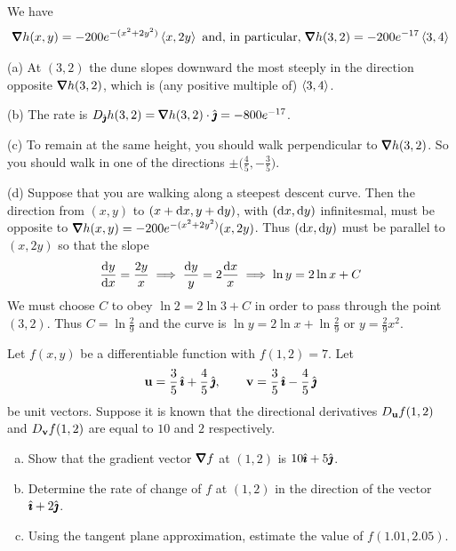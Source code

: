 \begin{solution}
We have
\begin{equation*}
\vnabla h(x,y)= -200 e^{-(x^2+2y^2)}\llt x,2y\rgt\text{ and, in particular, }
\vnabla h(3,2)= -200 e^{-17}\llt 3,4\rgt
\end{equation*}

(a) At $(3,2)$ the dune slopes downward the most steeply in the direction
opposite $\vnabla h(3,2)$, which is (any positive multiple of) $\left< 3,4\right>$.

(b) The rate is $D_{\hj} h(3,2)=\vnabla h(3,2)\cdot\hj=-800 e^{-17}$.

(c) To remain at the same height, you should walk perpendicular to
$\vnabla h(3,2)$. So you should walk in one of the directions 
$\pm\big(\frac{4}{5},-\frac{3}{5}\big)$.

(d) Suppose that you are walking along a steepest descent curve.
Then the direction from $(x,y)$ to $(x+\mathrm{d}x, y+\mathrm{d}y)$, with 
$(\mathrm{d}x,\mathrm{d}y)$ infinitesmal, must be opposite to 
$\vnabla h(x,y)= -200 e^{-(x^2+2y^2)}(x,2y)$.
Thus $(\mathrm{d}x,\mathrm{d}y)$ must be parallel to $(x,2y)$ so that the slope
\begin{align*}
\diff{y}{x}=\frac{2y}{x}
\implies \frac{\dee{y}}{y}=2\frac{\dee{x}}{x}
\implies \ln y=2\ln x+C
\end{align*}
We must choose $C$ to obey $\ln 2=2\ln 3+C$ in order to pass through 
the point $(3,2)$. Thus $C=\ln\frac{2}{9}$ and the curve is 
$\ln y=2\ln x+\ln\frac{2}{9}$ or $y=\frac{2}{9}x^2$.
\end{solution}

\begin{question}[M200 2002A] %
Let $f(x,y)$ be a differentiable function with $f(1,2)=7$. Let
\begin{equation*}
\mathbf{u}=\frac{3}{5}\,\hat{\pmb{\imath}}+\frac{4}{5}\,\hat{\pmb{\jmath}},\qquad
\mathbf{v}=\frac{3}{5}\,\hat{\pmb{\imath}}-\frac{4}{5}\,\hat{\pmb{\jmath}}
\end{equation*}
be unit vectors. Suppose it is known that the directional derivatives 
$D_{\mathbf{u}} f(1,2)$ and $D_{\mathbf{v}} f(1,2)$ are equal to $10$ and $2$ respectively.
\begin{enumerate}[(a)]
\item
Show that the gradient vector $\vnabla f$ at $(1,2)$ is $10\hat{\pmb{\imath}}+5\hat{\pmb{\jmath}}$.

\item 
Determine the rate of change of $f$ at $(1,2)$ in the direction
of the vector $\hat{\pmb{\imath}}+2\hat{\pmb{\jmath}}$.

\item 
Using the tangent plane approximation, estimate the value
of $f(1.01,2.05)$.
\end{enumerate}
\end{question}

